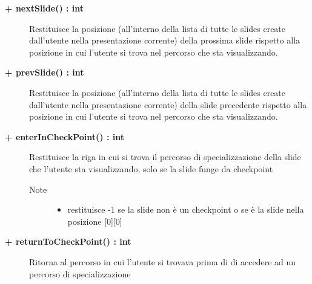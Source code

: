 \begin{description}
\begin{description}
\begin{description}
\begin{itemize}
				\end{itemize}
			
		\end{description}
	\end{description}
	
	\begin{description}
		\item[\textbf{\color{blue}+ nextSlide() : int			}] \hfill
			Restituisce la posizione (all'interno della lista di tutte le slides create dall'utente nella presentazione corrente) della prossima slide rispetto alla posizione in cui l'utente si trova nel percorso che sta visualizzando.
			
	\end{description}
	
	\begin{description}
		\item[\textbf{\color{blue}+ prevSlide() : int			}] \hfill
			Restituisce la posizione (all'interno della lista di tutte le slides create dall'utente nella presentazione corrente) della slide precedente rispetto alla posizione in cui l'utente si trova nel percorso che sta visualizzando.
			
	\end{description}
	
	
	\begin{description}
		\item[\textbf{\color{blue}+ enterInCheckPoint() : int			}] \hfill
			Restituisce la riga in cui si trova il percorso di specializzazione della slide che l'utente sta visualizzando, solo se la slide funge da checkpoint
			
		\begin{description}
			
			\item[Note] \hfill	
				\begin{itemize}
					\item restituisce -1 se la slide non è un checkpoint o se è la slide nella posizione [0][0]
				\end{itemize}
		\end{description}
			
	\end{description}
	
	\begin{description}
		\item[\textbf{\color{blue}+ returnToCheckPoint() : int			}] \hfill
			Ritorna al percorso in cui l'utente si trovava prima di di accedere ad un percorso di specializzazione
			

\end{description}
\end{description}

